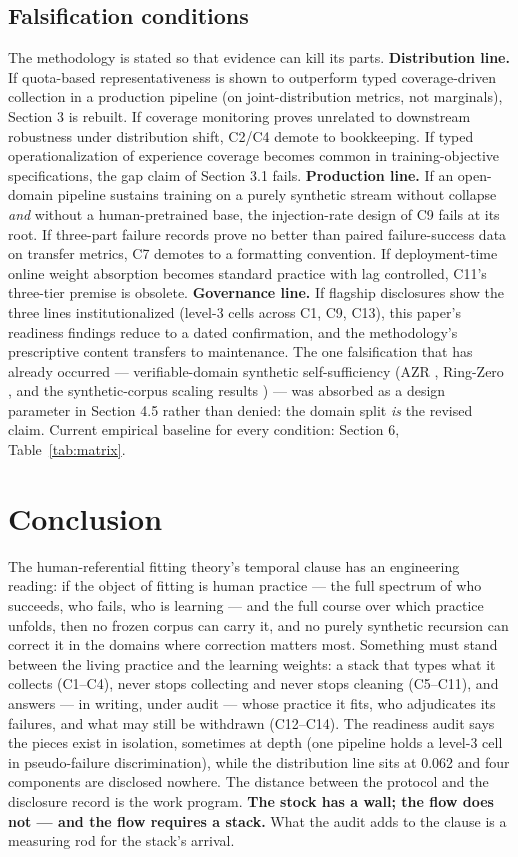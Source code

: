 \documentclass[10pt]{article}
\begin{document}
\subsection{Falsification conditions}

The methodology is stated so that evidence can kill its parts. \textbf{Distribution line.} If quota-based representativeness is shown to outperform typed coverage-driven collection in a production pipeline (on joint-distribution metrics, not marginals), Section 3 is rebuilt. If coverage monitoring proves unrelated to downstream robustness under distribution shift, C2/C4 demote to bookkeeping. If typed operationalization of experience coverage becomes common in training-objective specifications, the gap claim of Section 3.1 fails. \textbf{Production line.} If an open-domain pipeline sustains training on a purely synthetic stream without collapse \emph{and} without a human-pretrained base, the injection-rate design of C9 fails at its root. If three-part failure records prove no better than paired failure-success data on transfer metrics, C7 demotes to a formatting convention. If deployment-time online weight absorption becomes standard practice with lag controlled, C11's three-tier premise is obsolete. \textbf{Governance line.} If flagship disclosures show the three lines institutionalized (level-3 cells across C1, C9, C13), this paper's readiness findings reduce to a dated confirmation, and the methodology's prescriptive content transfers to maintenance. The one falsification that has already occurred --- verifiable-domain synthetic self-sufficiency (AZR \cite{ref37}, Ring-Zero \cite{ref38}, and the synthetic-corpus scaling results \cite{ref36}) --- was absorbed as a design parameter in Section 4.5 rather than denied: the domain split \emph{is} the revised claim. Current empirical baseline for every condition: Section 6, Table~\ref{tab:matrix}.

\section{Conclusion}

The human-referential fitting theory's temporal clause has an engineering reading: if the object of fitting is human practice --- the full spectrum of who succeeds, who fails, who is learning --- and the full course over which practice unfolds, then no frozen corpus can carry it, and no purely synthetic recursion can correct it in the domains where correction matters most. Something must stand between the living practice and the learning weights: a stack that types what it collects (C1--C4), never stops collecting and never stops cleaning (C5--C11), and answers --- in writing, under audit --- whose practice it fits, who adjudicates its failures, and what may still be withdrawn (C12--C14). The readiness audit says the pieces exist in isolation, sometimes at depth (one pipeline holds a level-3 cell in pseudo-failure discrimination), while the distribution line sits at 0.062 and four components are disclosed nowhere. The distance between the protocol and the disclosure record is the work program. \textbf{The stock has a wall; the flow does not --- and the flow requires a stack.} What the audit adds to the clause is a measuring rod for the stack's arrival.
\end{document}

